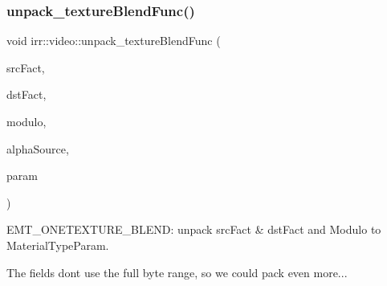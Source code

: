 \subsubsection{\texorpdfstring{unpack\+\_\+texture\+Blend\+Func()}{unpack\_textureBlendFunc()}}
{\footnotesize\ttfamily void irr\+::video\+::unpack\+\_\+texture\+Blend\+Func (\begin{DoxyParamCaption}\item[{\hyperlink{namespaceirr_1_1video_acae10401850a6cfd5fcf1548c6c884bc}{E\+\_\+\+B\+L\+E\+N\+D\+\_\+\+F\+A\+C\+T\+OR} \&}]{src\+Fact,  }\item[{\hyperlink{namespaceirr_1_1video_acae10401850a6cfd5fcf1548c6c884bc}{E\+\_\+\+B\+L\+E\+N\+D\+\_\+\+F\+A\+C\+T\+OR} \&}]{dst\+Fact,  }\item[{\hyperlink{namespaceirr_1_1video_a1402e9045137ae232fafbdf385800843}{E\+\_\+\+M\+O\+D\+U\+L\+A\+T\+E\+\_\+\+F\+U\+NC} \&}]{modulo,  }\item[{\hyperlink{namespaceirr_a0416a53257075833e7002efd0a18e804}{u32} \&}]{alpha\+Source,  }\item[{const \hyperlink{namespaceirr_a0277be98d67dc26ff93b1a6a1d086b07}{f32}}]{param }\end{DoxyParamCaption})\hspace{0.3cm}{\ttfamily [inline]}}



E\+M\+T\+\_\+\+O\+N\+E\+T\+E\+X\+T\+U\+R\+E\+\_\+\+B\+L\+E\+ND\+: unpack src\+Fact \& dst\+Fact and Modulo to Material\+Type\+Param. 

The fields don\textquotesingle{}t use the full byte range, so we could pack even more... 